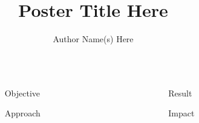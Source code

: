 \documentclass[final,t]{beamer}
\title{\ACMEHuge Poster Title Here}
\author{\ACMELARGE
  Author Name(s) Here
}
\newcommand{\ACMELarge}{\fontsize{72}{86}\selectfont}
\begin{document}
\begin{frame}[fragile]{}

  \LARGE
  \begin{columns}[t]


    \begin{column}{0.01\linewidth}
    \end{column}

    \begin{column}{0.48\linewidth}
      \begin{block}{\ACMELarge Objective}
      \end{block}
      
      \begin{block}{\ACMELarge Approach}
      \end{block}
    \end{column}


    \begin{column}{0.01\linewidth}
    \end{column}

    \begin{column}{0.48\linewidth}
      \begin{block}{\ACMELarge Result}
      \end{block}
      
      \begin{block}{\ACMELarge Impact}
      \end{block}

    \end{column}
    
  \end{columns}

\end{frame}
\end{document}
